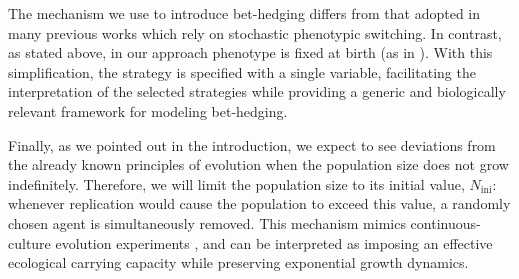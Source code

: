 \documentclass[aps,pre,reprint,10pt,superscriptaddress]{revtex4-2}
\begin{document}
The mechanism we use to introduce bet-hedging differs from that adopted in many previous works
\cite{kussellPhenotypicDiversityPopulation2005,patraEmergencePhenotypeSwitching2015,bressloffStochasticSwitchingBiology2017,huftonPhenotypicSwitchingPopulations2018,villamartinBethedgingStrategiesExpanding2019,dinisParetooptimalTradeoffPhenotypic2022} which rely on stochastic phenotypic switching. In contrast, as stated above, in our approach phenotype is fixed at birth (as in \cite{xueBetHedgingDemographic2017}). With this simplification, the strategy is specified with a single variable, facilitating the interpretation of the selected strategies while providing a generic and biologically relevant framework for modeling bet-hedging.

Finally, as we pointed out in the introduction, we expect to see deviations from the already known principles of evolution when the population size does not grow indefinitely. Therefore, we will limit the population size to its initial value, $N_\text{ini}$: whenever replication would cause the population to exceed this value, a randomly chosen agent is simultaneously removed. This mechanism mimics continuous-culture evolution experiments \cite{collectiveEconomicPrinciplesCell}, and can be interpreted as imposing an effective ecological carrying capacity while preserving exponential growth dynamics.
\end{document}
